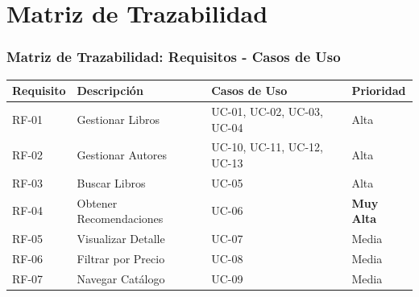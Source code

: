 \documentclass[aspectratio=169]{beamer}
\begin{document}
\section{Matriz de Trazabilidad}

\begin{frame}
\frametitle{Matriz de Trazabilidad: Requisitos - Casos de Uso}

\begin{table}
\centering
\small
\begin{tabular}{p{2cm}p{4cm}p{4cm}p{2cm}}
\toprule
\textbf{Requisito} & \textbf{Descripción} & \textbf{Casos de Uso} & \textbf{Prioridad} \\
\midrule
RF-01 & Gestionar Libros & UC-01, UC-02, UC-03, UC-04 & Alta \\
RF-02 & Gestionar Autores & UC-10, UC-11, UC-12, UC-13 & Alta \\
RF-03 & Buscar Libros & UC-05 & Alta \\
RF-04 & Obtener Recomendaciones & UC-06 & \textbf{Muy Alta} \\
RF-05 & Visualizar Detalle & UC-07 & Media \\
RF-06 & Filtrar por Precio & UC-08 & Media \\
RF-07 & Navegar Catálogo & UC-09 & Media \\
\bottomrule
\end{tabular}
\end{table}

\end{frame}
\end{document}
